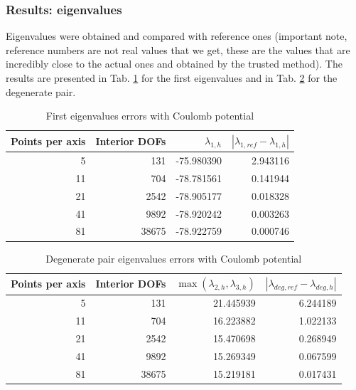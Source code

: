 \documentclass[acmsmall,screen]{MapleTrans}
\begin{document}
\subsubsection{Results: eigenvalues}
Eigenvalues were obtained and compared with reference ones (important note, reference numbers are not real values that we get, these are the values that are incredibly close to the actual ones and obtained by the trusted method). The results are presented in Tab. \ref{tab:first eigvals errors} for the first eigenvalues and in Tab. \ref{tab:degenerate pair errors} for the degenerate pair.
\begin{table}[H]
    \centering
    \caption{First eigenvalues errors with Coulomb potential}
    \label{tab:first eigvals errors}
    \begin{tabular}{rrrr}
        \toprule
        Points per axis & Interior DOFs & $\lambda_{1,h}$ & $|\lambda_{1,ref} - \lambda_{1,h}|$ \\
        \midrule
        5 & 131 & -75.980390 & 2.943116 \\
        11 & 704 & -78.781561 & 0.141944 \\
        21 & 2542 & -78.905177 & 0.018328 \\
        41 & 9892 & -78.920242 & 0.003263 \\
        81 & 38675 & -78.922759 & 0.000746 \\
        \bottomrule
    \end{tabular}
\end{table}

\begin{table}[H]
    \centering
    \caption{Degenerate pair eigenvalues errors with Coulomb potential}
    \label{tab:degenerate pair errors}
    \begin{tabular}{rrrr}
        \toprule
        Points per axis & Interior DOFs & $\max(\lambda_{2,h}, \lambda_{3,h})$ & $|\lambda_{deg,ref} - \lambda_{deg,h}|$ \\
        \midrule
        5 & 131 & 21.445939 & 6.244189 \\
        11 & 704 & 16.223882 & 1.022133 \\
        21 & 2542 & 15.470698 & 0.268949 \\
        41 & 9892 & 15.269349 & 0.067599 \\
        81 & 38675 & 15.219181 & 0.017431 \\
        \bottomrule
    \end{tabular}
\end{table}
\end{document}
